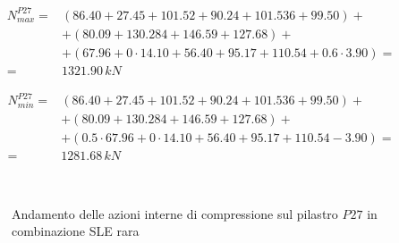 \begin{align*}
	N_{max}^{P27} =& (86.40+27.45+101.52+90.24+101.536+99.50)+\\
	&+(80.09+130.284+146.59+127.68)+\\
	&+(67.96+0\cdot14.10+56.40+95.17+110.54+0.6\cdot3.90) =\\
	=& 1321.90\,kN
\end{align*}

\begin{align*}
	N_{min}^{P27} =& (86.40+27.45+101.52+90.24+101.536+99.50)+\\
	&+(80.09+130.284+146.59+127.68)+\\
	&+(0.5\cdot67.96+0\cdot14.10+56.40+95.17+110.54-3.90) =\\
	=& 1281.68\,kN
\end{align*}

\begin{figure}
	\centering
	\\
	\caption{Andamento delle azioni interne di compressione sul pilastro $P27$ in combinazione SLE rara}
	\label{fig:P27axialLoad_sleRara}
\end{figure}

